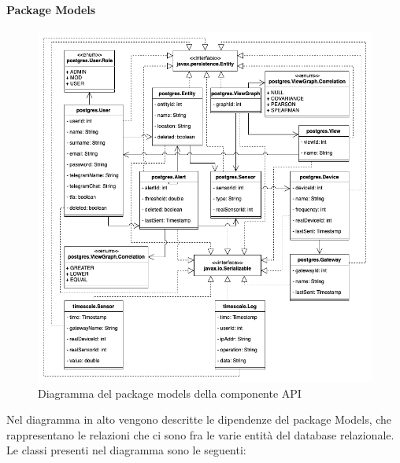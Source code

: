 		\paragraph*{Package Models}
		\newpage
		\begin{figure}[H]
			\centering
			\includegraphics[scale=0.550]{res/images/API/ModelsPackage.png}
			\caption{Diagramma del package models della componente API}
			\label{Diagramma 14}
		\end{figure}
		Nel diagramma in alto vengono descritte le dipendenze del package Models, che rappresentano le relazioni che ci sono fra le varie entità del database relazionale.
		Le classi presenti nel diagramma sono le seguenti:
